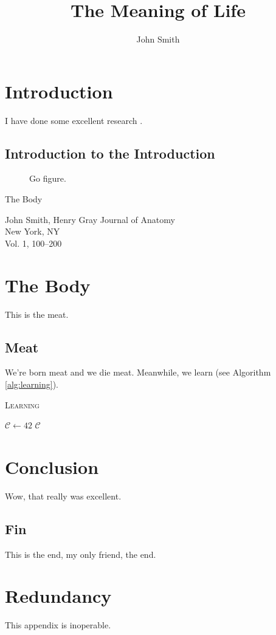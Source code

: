 \documentclass[onehalf,11pt]{beavtex}
\title{The Meaning of Life}
\author{John Smith}
\begin{document}
\maketitle

\mainmatter

\chapter{Introduction}
I have done some excellent research \cite{matrix}.
\section{Introduction to the Introduction}
\begin{figure}[!ht]
\centering
{}
\caption{Go figure.}
\end{figure}

\phantom{}\newpage
\phantom{}\vfill
\begin{center}
\heading
The Body
\end{center}
\vfill
John Smith, Henry Gray
\vfill\noindent
Journal of Anatomy\\
New York, NY\\
Vol. 1, 100--200
\vfill
\chapter{The Body}
This is the meat.
\section{Meat}
We're born meat and we die meat. Meanwhile, we learn (see Algorithm \ref{alg:learning}).

\begin{algorithm}[h]
\caption{\textsc{Learning}}
\label{alg:learning}
\begin{algorithmic}[1]
	\STATE $\mathcal{C} \gets 42$
	\RETURN $\mathcal{C}$
\end{algorithmic}
\end{algorithm}

\chapter{Conclusion}
Wow, that really was excellent.
\section{Fin}
This is the end, my only friend, the end.





\appendix
\chapter{Redundancy}
This appendix is inoperable.
\end{document}

